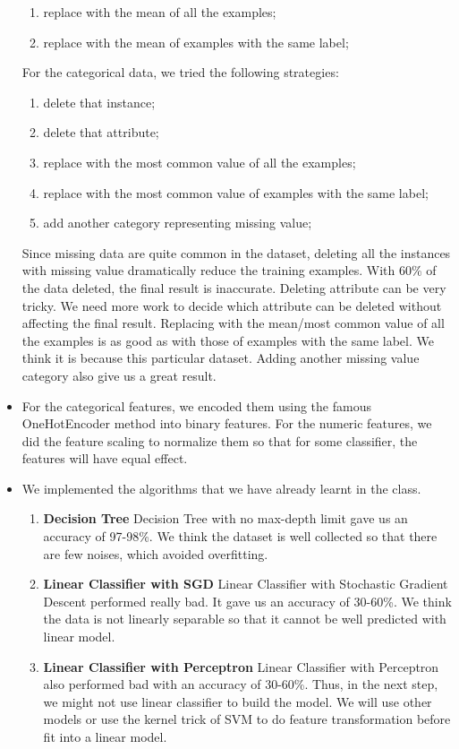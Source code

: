 \documentclass[11pt]{article}
\begin{document}
\begin{itemize}
\begin{enumerate}
    \item replace with the mean of all the examples;
    \item replace with the mean of examples with the same label;
\end{enumerate}
For the categorical data, we tried the following strategies:
\begin{enumerate}
    \item delete that instance;
    \item delete that attribute;
    \item replace with the most common value of all the examples;
    \item replace with the most common value of examples with the same
    label;
    \item add another category representing missing value;
\end{enumerate}
Since missing data are quite common in the dataset, deleting all the instances with missing value dramatically reduce the training examples. With 60\% of the data deleted, the final result is inaccurate. Deleting attribute can be very tricky. We need more work to decide which attribute can be deleted without affecting the final result.
Replacing with the mean/most common value of all the examples is as good as with those of examples with the same label. We think it is because this particular dataset.
Adding another missing value category also give us a great result.
\item For the categorical features, we encoded them using the famous OneHotEncoder method into binary features. For the numeric features, we did the feature scaling to normalize them so that for some classifier, the features will have equal effect.
\item We implemented the algorithms that we have already learnt in the class.
\begin{enumerate}
    \item \textbf{Decision Tree} Decision Tree with no max-depth limit gave us an accuracy of 97-98\%. We think the dataset is well collected so that there are few noises, which avoided overfitting.
    \item \textbf{Linear Classifier with SGD} Linear Classifier with Stochastic Gradient Descent performed really bad. It gave us an accuracy of 30-60\%. We think the data is not linearly separable so that it cannot be well predicted with linear model.
    \item \textbf{Linear Classifier with Perceptron} Linear Classifier with Perceptron also performed bad with an accuracy of 30-60\%. Thus, in the next step, we might not use linear classifier to build the model. We will use other models or use the kernel trick of SVM to do feature transformation before fit into a linear model.
\end{enumerate}
\end{itemize}
\end{document}
